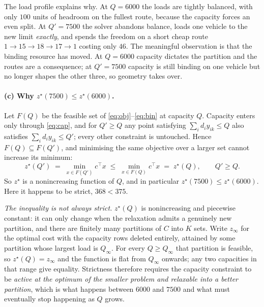 \documentclass[11pt]{article}
\DeclareMathOperator*{\minimize}{min}
\newcommand{\T}{^{\!\top}}
\begin{document}
The load profile explains why. At $Q = 6000$ the loads are tightly
balanced, with only $100$ units of headroom on the fullest route,
because the capacity forces an even split. At $Q' = 7500$ the solver
abandons balance, loads one vehicle to the new limit \emph{exactly},
and spends the freedom on a short cheap route
$1 \to 15 \to 18 \to 17 \to 1$ costing only $46$. The meaningful
observation is that the binding resource has moved. At $Q = 6000$
capacity dictates the partition and the routes are a consequence; at
$Q' = 7500$ capacity is still binding on one vehicle but no longer
shapes the other three, so geometry takes over.

\paragraph{(c) Why $z^\star(7500) \le z^\star(6000)$.}
Let $F(Q)$ be the feasible set of
\eqref{eq:obj}--\eqref{eq:bin} at capacity $Q$. Capacity enters only
through \eqref{eq:cap}, and for $Q' \ge Q$ any point satisfying
$\sum_i d_i y_{ik} \le Q$ also satisfies
$\sum_i d_i y_{ik} \le Q'$; every other constraint is untouched. Hence
$F(Q) \subseteq F(Q')$, and minimising the same objective over a larger
set cannot increase its minimum:
\[
  z^\star(Q') \;=\; \minimize_{x \in F(Q')} c\T x
  \;\le\; \minimize_{x \in F(Q)} c\T x \;=\; z^\star(Q),
  \qquad Q' \ge Q .
\]
So $z^\star$ is a nonincreasing function of $Q$, and in particular
$z^\star(7500) \le z^\star(6000)$. Here it happens to be strict,
$368 < 375$.

\emph{The inequality is not always strict.} $z^\star(Q)$ is
nonincreasing and piecewise constant: it can only change when the
relaxation admits a genuinely new partition, and there are finitely
many partitions of $C$ into $K$ sets. Write $z_\infty$ for the optimal
cost with the capacity rows deleted entirely, attained by some
partition whose largest load is $Q_\infty$. For every $Q \ge Q_\infty$
that partition is feasible, so $z^\star(Q) = z_\infty$ and the function
is flat from $Q_\infty$ onwards; any two capacities in that range give
equality. Strictness therefore requires the capacity constraint to be
\emph{active at the optimum of the smaller problem and relaxable into a
better partition}, which is what happens between $6000$ and $7500$ and
what must eventually stop happening as $Q$ grows.
\end{document}
